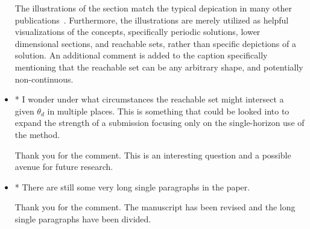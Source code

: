 \documentclass[11pt]{article}
\begin{document}
\begin{itemize}
        The illustrations of the \Poincare section match the typical depication in many other publications~\cite{koon2001}.
        Furthermore, the illustrations are merely utilized as helpful visualizations of the concepts, specifically periodic solutions, lower dimensional \Poincare sections, and reachable sets, rather than specific depictions of a solution.
        An additional comment is added to the caption specifically mentioning that the reachable set can be any arbitrary shape, and potentially non-continuous.

    \item
        \begin{itshape}

            * I wonder under what circumstances the reachable set might intersect a
            given $\theta_d$ in multiple places.  This is something that could be looked
            into to expand the strength of a submission focusing only on the
            single-horizon use of the method.
        \end{itshape}
        
        Thank you for the comment.
        This is an interesting question and a possible avenue for future research.

    \item 
        \begin{itshape}

            * There are still some very long single paragraphs in the paper.
        \end{itshape}
        
        Thank you for the comment. 
        The manuscript has been revised and the long single paragraphs have been divided.
\end{itemize}



\end{document}

